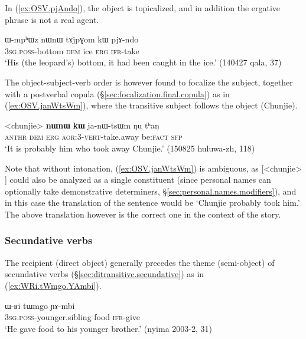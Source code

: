 In (\ref{ex:OSV.pjAndo}), the object  is topicalized, and in addition the ergative phrase  is not a real agent.

\begin{exe}
\ex \label{ex:OSV.pjAndo}
\gll  ɯ-mpʰɯz nɯnɯ tɤjpɣom kɯ pjɤ-ndo \\
\textsc{3sg}.\textsc{poss}-bottom \textsc{dem} ice \textsc{erg} \textsc{ifr}-take \\
\glt `His (the leopard's) bottom, it had been caught in the ice.' (140427 qala, 37)
\end{exe}
 
The object-subject-verb order is however found to focalize the subject, together with a postverbal copula (§\ref{sec:focalization.final.copula}) as in  (\ref{ex:OSV.janWtsWm}), where the transitive subject  follows the object (Chunjie). 

 
\begin{exe}
\ex \label{ex:OSV.janWtsWm}
\gll <chunjie> \textbf{nɯnɯ} \textbf{kɯ} ja-nɯ-tsɯm ŋu tʰaŋ \\
\textsc{anthr} \textsc{dem} \textsc{erg} \textsc{aor}:3\flobv{}-\textsc{vert}-take.away be:\textsc{fact} \textsc{sfp} \\
\glt `It is probably him who took away Chunjie.' (150825 huluwa-zh, 118)
\end{exe}

Note that without intonation, (\ref{ex:OSV.janWtsWm}) is ambiguous, as [<chunjie> ] could also be analyzed as a single constituent (since personal names can optionally take demonstrative determiners, §\ref{sec:personal.names.modifiers}), and in this case the translation of the sentence would be `Chunjie probably took him.' The above translation however is the correct one in the context of the story.


\subsubsection{Secundative verbs} \label{sec:secundative.word.order}
The recipient (direct object) generally precedes the theme (semi-object) of secundative verbs (§\ref{sec:ditransitive.secundative}) as in (\ref{ex:WRi.tWmgo.YAmbi}).


\begin{exe}
\ex \label{ex:WRi.tWmgo.YAmbi}
\gll ɯ-ʁi tɯmgo ɲɤ-mbi \\
\textsc{3sg}.\textsc{poss}-younger.sibling food \textsc{ifr}-give \\
\glt `He gave food to his younger brother.' (nyima 2003-2, 31)
\end{exe}

